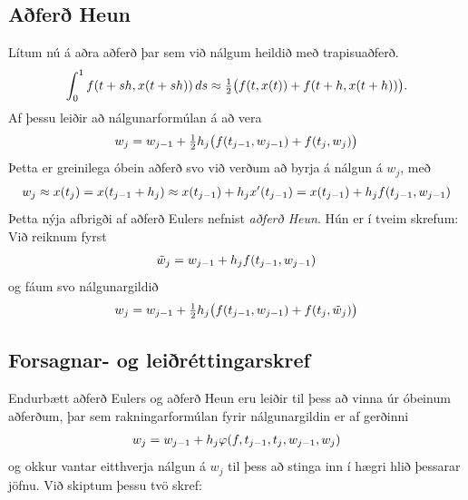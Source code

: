 \documentclass[letterpaper,10pt,icelandic]{sphinxmanual}
\begin{document}
\subsection{Aðferð Heun}
\label{kafli06:afer-heun}\label{kafli06:index-9}
Lítum nú á aðra aðferð þar sem við nálgum heildið með trapisuaðferð.
\begin{gather}
\begin{split}\int_0^1f(t+sh,x(t+sh))\, ds \approx
\tfrac 12 \big(f(t,x(t))+f(t+h,x(t+h))\big).\end{split}\notag
\end{gather}
Af þessu leiðir að nálgunarformúlan á að vera
\begin{gather}
\begin{split}w_j=w_{j-1}+\tfrac 12h_j\big(f(t_{j-1},w_{j-1})+f(t_j,w_j)\big)\end{split}\notag
\end{gather}
Þetta er greinilega óbein aðferð svo við verðum að byrja á nálgun á
\(w_j\), með
\begin{gather}
\begin{split}w_j\approx x(t_j)=x(t_{j-1}+h_j)\approx x(t_{j-1})+h_jx'(t_{j-1})
=x(t_{j-1})+h_jf(t_{j-1},w_{j-1})\end{split}\notag
\end{gather}
Þetta nýja afbrigði af aðferð Eulers nefnist \emph{aðferð Heun}. Hún er í
tveim skrefum: Við reiknum fyrst
\begin{gather}
\begin{split}\tilde w_j = w_{j-1} + h_jf(t_{j-1},w_{j-1})\end{split}\notag
\end{gather}
og fáum svo nálgunargildið
\begin{gather}
\begin{split}w_j = w_{j-1} + \tfrac 12h_j
\big(f(t_{j-1},w_{j-1})+f(t_j,\tilde w_j)\big)\end{split}\notag
\end{gather}

\subsection{Forsagnar- og leiðréttingarskref}
\label{kafli06:forsagnar-og-leirettingarskref}\label{kafli06:index-10}
Endurbætt aðferð Eulers og aðferð Heun eru leiðir til þess að vinna úr
óbeinum aðferðum, þar sem rakningarformúlan fyrir nálgunargildin er af
gerðinni
\begin{gather}
\begin{split}w_j=w_{j-1}+h_j\varphi(f,t_{j-1},t_j,w_{j-1},w_j)\end{split}\notag
\end{gather}
og okkur vantar eitthverja nálgun á \(w_j\) til þess að stinga inn í
hægri hlið þessarar jöfnu. Við skiptum þessu tvö skref:
\end{document}
